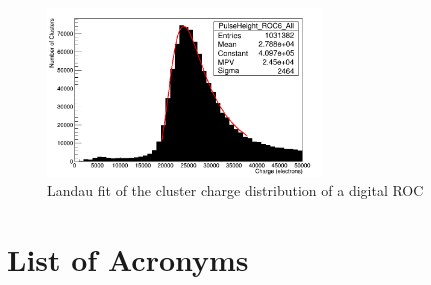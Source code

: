 \documentclass[british,11pt,a4paper]{memoir}
\begin{document}
\begin{figure}[ht]
	\centering
	\includegraphics[width=0.65\textwidth]{tracking/landaufit}
	\caption{Landau fit of the cluster charge distribution of a digital \ac{ROC}}
	\label{plandaufit}
\end{figure}\no
\chapter*{List of Acronyms}


% 
\end{document}
